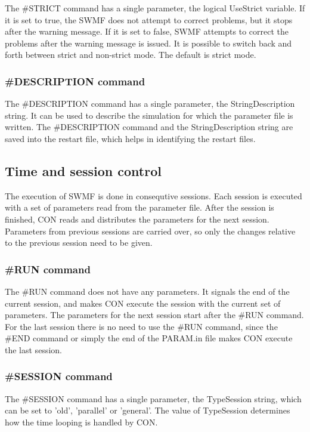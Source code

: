 The \#STRICT command has a single parameter, the logical UseStrict variable.
If it is set to true, the SWMF does not attempt to correct problems,
but it stops after the warning message. If it is set to false, SWMF
attempts to correct the problems after the warning message is issued.
It is possible to switch back and forth between strict and non-strict 
mode. The default is strict mode.

\subsubsection{\#DESCRIPTION command}

The \#DESCRIPTION command has a single parameter, the StringDescription
string. It can be used to describe the simulation for which the parameter
file is written. The \#DESCRIPTION command and the StringDescription
string are saved into the restart file, which helps in identifying the
restart files. 

\subsection{Time and session control}

The execution of SWMF is done in consequtive sessions. Each session is
executed with a set of parameters read from the parameter file.
After the session is finished, CON reads and distributes the parameters for 
the next session. Parameters from previous sessions are carried over,
so only the changes relative to the previous session need to be given.

\subsubsection{\#RUN command}

The \#RUN command does not have any parameters. It signals the end
of the current session, and makes CON execute the session with
the current set of parameters. The parameters for the next session
start after the \#RUN command. For the last session there is no
need to use the \#RUN command, since the \#END command or simply
the end of the PARAM.in file makes CON execute the last session.

\subsubsection{\#SESSION command}

The \#SESSION command has a single parameter, the TypeSession string,
which can be set to 'old', 'parallel' or 'general'. The value of 
TypeSession determines how the time looping is handled by CON.

